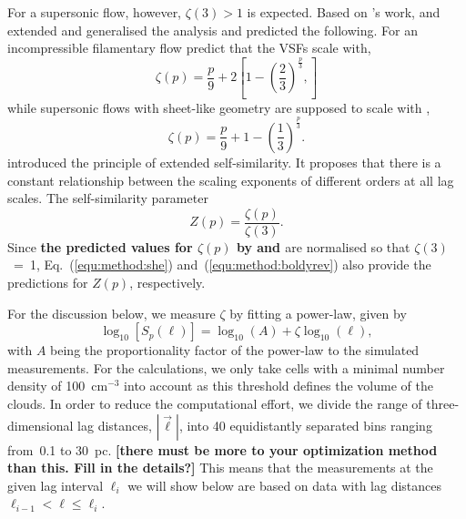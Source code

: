 For a supersonic flow, however, 
       $\zeta(3) >1$ is expected.
Based on \citeauthor{Kolmogorov1941}'s work, \citet{She1994} and \citet{Boldyrev2002} extended and generalised the analysis and predicted the following.
For an incompressible filamentary flow \citet{She1994} predict that the VSFs scale with,
\begin{equation}
	\zeta(p) = \frac{p}{9} + 2 \left[ 1 - \left( \frac{2}{3} \right)^{\frac{p}{3}}, \right] %
    \label{equ:method:she}
\end{equation}
while supersonic flows with sheet-like geometry are supposed to scale with \citep{Boldyrev2002},
\begin{equation}
	 \zeta(p) = \frac{p}{9} + 1 - \left( \frac{1}{3} \right)^{\frac{p}{3}}.
    \label{equ:method:boldyrev}
\end{equation}
\citet{Benzi1993} introduced the principle of extended self-similarity.
It proposes that there is a constant relationship between the scaling exponents of different orders at all lag scales. 
      The self-similarity parameter
\begin{equation}
	Z(p) = \frac{\zeta(p)}{\zeta(3)} .
	\label{equ:method:z_def}
\end{equation} 
Since \textbf{the predicted values for $\zeta(p)$ by \citet{She1994} and \citet{Boldyrev2002}} are normalised so that $\zeta(3)$~=~1, Eq.~(\ref{equ:method:she}) and~(\ref{equ:method:boldyrev}) also provide the predictions for $Z(p)$, respectively.

For the discussion below, we measure $\zeta$ by fitting a power-law, given by
\begin{equation}
	\log_{10}\left[ S_p(\ell) \right] = \log_{10}\left(A\right) + \zeta \log_{10}(\ell) ,
    \label{equ:method:fitting}
\end{equation}
with $A$ being the proportionality factor of the power-law to the simulated measurements.
For the calculations, we only take cells with a minimal number density of 100~cm$^{-3}$ into account as this threshold defines the volume of the clouds.
    In order to reduce
the computational effort, we divide the range of three-dimensional lag distances, $|\vec{\ell}|$, into 40 equidistantly separated bins ranging from~0.1 to 30~pc.
{\bf [there must be more to your optimization method than this.  Fill in the details?]}
This means that the measurements at the given lag interval $\ell_i$ we will show below are based on data with lag distances $\ell_{i-1} < \ell \leq \ell_i$.



\endinput

